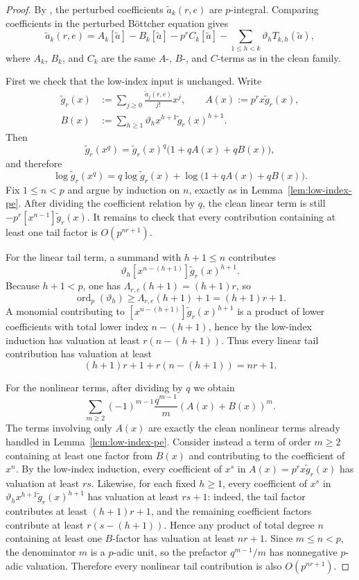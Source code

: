 \documentclass[11pt]{amsart}
\numberwithin{equation}{section}
\DeclareMathOperator{\ordop}{ord}
\newcommand{\vp}{\ordop_p}
\begin{document}
\begin{proof}
By \cite[Theorem~3(b)]{SalernoSilverman}, the perturbed coefficients $\widetilde a_k(r,e)$ are $p$-integral.  Comparing coefficients in the perturbed B\"ottcher equation gives
\begin{equation}\label{eq:tail-recursion-higher}
        \widetilde a_k(r,e)=A_k[\widetilde a]-B_k[\widetilde a]-p^rC_k[\widetilde a]-\sum_{1\le h<k}\vartheta_hT_{k,h}(\widetilde a),
\end{equation}
where $A_k$, $B_k$, and $C_k$ are the same $A$-, $B$-, and $C$-terms as in the clean family.

First we check that the low-index input is unchanged.  Write
\[
\begin{aligned}
        \widetilde g_r(x)&:=\sum_{j\ge0}\frac{\widetilde a_j(r,e)}{j!}x^j,\qquad
        A(x):=p^r x\widetilde g_r(x),\\
        B(x)&:=\sum_{h\ge1}\vartheta_hx^{h+1}\widetilde g_r(x)^{h+1}.
\end{aligned}
\]
Then
\[
        \widetilde g_r(x^q)=\widetilde g_r(x)^q\bigl(1+qA(x)+qB(x)\bigr),
\]
and therefore
\[
        \log \widetilde g_r(x^q)=q\log \widetilde g_r(x)+\log\bigl(1+qA(x)+qB(x)\bigr).
\]
Fix $1\le n<p$ and argue by induction on $n$, exactly as in Lemma~\ref{lem:low-index-pe}.  After dividing the coefficient relation by $q$, the clean linear term is still $-p^r[x^{n-1}]\widetilde g_r(x)$.  It remains to check that every contribution containing at least one tail factor is $O(p^{nr+1})$.

For the linear tail term, a summand with $h+1\le n$ contributes
\[
        \vartheta_h[x^{n-(h+1)}]\widetilde g_r(x)^{h+1}.
\]
Because $h+1<p$, one has $\Lambda_{r,e}(h+1)=(h+1)r$, so
\[
        \vp(\vartheta_h)\ge \Lambda_{r,e}(h+1)+1=(h+1)r+1.
\]
A monomial contributing to $[x^{n-(h+1)}]\widetilde g_r(x)^{h+1}$ is a product of lower coefficients with total lower index $n-(h+1)$, hence by the low-index induction has valuation at least $r(n-(h+1))$.  Thus every linear tail contribution has valuation at least
\[
        (h+1)r+1+r(n-(h+1))=nr+1.
\]

For the nonlinear terms, after dividing by $q$ we obtain
\[
        \sum_{m\ge2}(-1)^{m-1}\frac{q^{m-1}}{m}(A(x)+B(x))^m.
\]
The terms involving only $A(x)$ are exactly the clean nonlinear terms already handled in Lemma~\ref{lem:low-index-pe}.  Consider instead a term of order $m\ge2$ containing at least one factor from $B(x)$ and contributing to the coefficient of $x^n$.  By the low-index induction, every coefficient of $x^s$ in $A(x)=p^r x\widetilde g_r(x)$ has valuation at least $rs$.  Likewise, for each fixed $h\ge1$, every coefficient of $x^s$ in $\vartheta_hx^{h+1}\widetilde g_r(x)^{h+1}$ has valuation at least $rs+1$: indeed, the tail factor contributes at least $(h+1)r+1$, and the remaining coefficient factors contribute at least $r(s-(h+1))$.  Hence any product of total degree $n$ containing at least one $B$-factor has valuation at least $nr+1$.  Since $m\le n<p$, the denominator $m$ is a $p$-adic unit, so the prefactor $q^{m-1}/m$ has nonnegative $p$-adic valuation.  Therefore every nonlinear tail contribution is also $O(p^{nr+1})$.


\end{proof}
\end{document}
